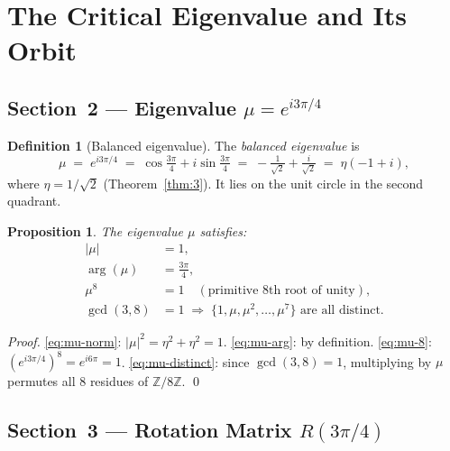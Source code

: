 \documentclass[12pt,a4paper]{article}
\theoremstyle{plain}
\newtheorem{proposition}[theorem]{Proposition}
\theoremstyle{definition}
\newtheorem{definition}[theorem]{Definition}
\theoremstyle{remark}
\newcommand{\Z}{\mathbb{Z}}
\newcommand{\abs}[1]{\lvert #1 \rvert}
\begin{document}
\section{The Critical Eigenvalue and Its Orbit}
\label{sec:eigenvalue}

\subsection{Section~2 — Eigenvalue \texorpdfstring{$\mu = e^{i3\pi/4}$}{mu}}

\begin{definition}[Balanced eigenvalue]\label{def:mu}
  The \emph{balanced eigenvalue} is
  \begin{equation}
    \mu \;=\; e^{i3\pi/4}
        \;=\; \cos\!\tfrac{3\pi}{4} + i\sin\!\tfrac{3\pi}{4}
        \;=\; -\tfrac{1}{\sqrt{2}} + \tfrac{i}{\sqrt{2}}
        \;=\; \eta(-1+i),
    \label{eq:mu}
  \end{equation}
  where $\eta = 1/\sqrt{2}$ (Theorem~\ref{thm:3}).
  It lies on the unit circle in the second quadrant.
\end{definition}

\begin{proposition}\label{prop:mu-props}
  The eigenvalue $\mu$ satisfies:
  \begin{align}
    \abs{\mu} &= 1, \label{eq:mu-norm}\\
    \arg(\mu) &= \tfrac{3\pi}{4}, \label{eq:mu-arg}\\
    \mu^8 &= 1 \quad(\text{primitive 8th root of unity}), \label{eq:mu-8}\\
    \gcd(3,8) &= 1 \;\Rightarrow\; \{1,\mu,\mu^2,\ldots,\mu^7\}
               \text{ are all distinct.} \label{eq:mu-distinct}
  \end{align}
\end{proposition}

\begin{proof}
  \eqref{eq:mu-norm}: $\abs{\mu}^2 = \eta^2+\eta^2 = 1$.
  \eqref{eq:mu-arg}: by definition.
  \eqref{eq:mu-8}: $(e^{i3\pi/4})^8 = e^{i6\pi} = 1$.
  \eqref{eq:mu-distinct}: since $\gcd(3,8)=1$, multiplying by $\mu$ permutes
  all 8 residues of $\Z/8\Z$. \qed
\end{proof}

\subsection{Section~3 — Rotation Matrix \texorpdfstring{$R(3\pi/4)$}{R(3pi/4)}}
\end{document}
